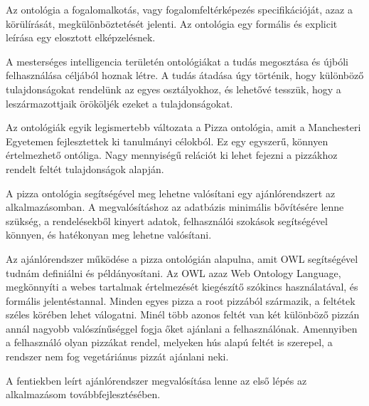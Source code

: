 Az ontológia a fogalomalkotás, vagy fogalomfeltérképezés specifikációját, azaz a körülírását, megkülönböztetését jelenti. Az ontológia egy formális és explicit leírása egy elosztott elképzelésnek. 

A mesterséges intelligencia területén ontológiákat a tudás megosztása és újbóli felhasználása céljából hoznak létre. A tudás átadása úgy történik, hogy különböző tulajdonságokat rendelünk az egyes osztályokhoz, és lehetővé tesszük, hogy a leszármazottjaik örököljék ezeket a tulajdonságokat.

Az ontológiák egyik legismertebb változata a Pizza ontológia, amit a Manchesteri Egyetemen fejlesztettek ki tanulmányi célokból. Ez egy egyszerű, könnyen értelmezhető ontóliga. Nagy mennyiségű relációt ki lehet fejezni a pizzákhoz rendelt feltét tulajdonságok alapján.

A pizza ontológia segítségével meg lehetne valósítani egy ajánlórendszert az alkalmazásomban. A megvalósításhoz az adatbázis minimális bővítésére lenne szükség, a rendelésekből kinyert adatok, felhasználói szokások segítségével könnyen, és hatékonyan meg lehetne valósítani.

Az ajánlórendszer működése a pizza ontológián alapulna, amit OWL segítségével tudnám definiálni és példányosítani. Az OWL azaz Web Ontology Language, megkönnyíti a webes tartalmak értelmezését kiegészítő szókincs használatával, és formális jelentéstannal. Minden egyes pizza a root pizzából származik, a feltétek széles körében lehet válogatni. Minél több azonos feltét van két különböző pizzán annál nagyobb valószínűséggel fogja őket ajánlani a felhasználónak. Amennyiben a felhasználó olyan pizzákat rendel, melyeken hús alapú feltét is szerepel, a rendszer nem fog vegetáriánus pizzát ajánlani neki.

A fentiekben leírt ajánlórendszer megvalósítása lenne az első lépés az alkalmazásom továbbfejlesztésében. 